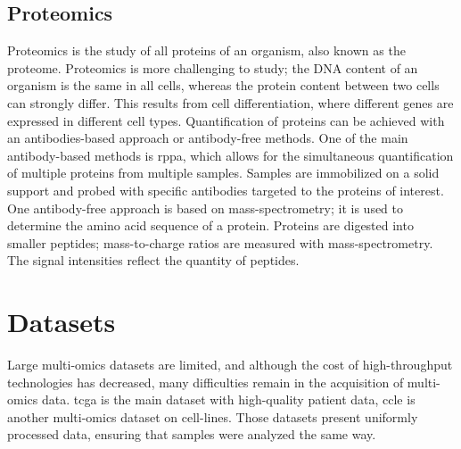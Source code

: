 \documentclass[../main.tex]{subfiles}
\begin{document}
	\subsection{Proteomics}\label{subsec:proteomics}
		Proteomics is the study of all proteins of an organism, also known as the proteome.
		Proteomics is more challenging to study; the DNA content of an organism is the same in all cells, whereas the protein content between two cells can strongly differ.
		This results from cell differentiation, where different genes are expressed in different cell types.
		Quantification of proteins can be achieved with an antibodies-based approach or antibody-free methods.
		One of the main antibody-based methods is \gls{rppa}, which allows for the simultaneous quantification of multiple proteins from multiple samples.
		Samples are immobilized on a solid support and probed with specific antibodies targeted to the proteins of interest.
		One antibody-free approach is based on mass-spectrometry; it is used to determine the amino acid sequence of a protein.
		Proteins are digested into smaller peptides; mass-to-charge ratios are measured with mass-spectrometry.
		The signal intensities reflect the quantity of peptides.

\section{Datasets}
	Large multi-omics datasets are limited, and although the cost of high-throughput technologies has decreased, many difficulties remain in the acquisition of multi-omics data.
	\Gls{tcga} is the main dataset with high-quality patient data, \gls{ccle} is another multi-omics dataset on cell-lines.
	Those datasets present uniformly processed data, ensuring that samples were analyzed the same way.
\end{document}
